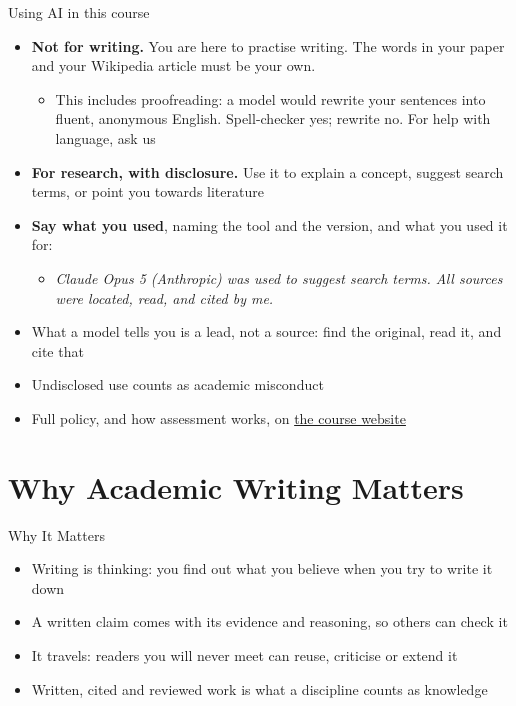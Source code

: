 \documentclass[aspectratio=169]{beamer}
\newcommand{\website}{\href{https://bond-lab.github.io/Open-Knowledge/}{the course website}}
\begin{document}
\begin{frame}{Using AI in this course}
\begin{itemize}
  \item \textbf{Not for writing.}  You are here to practise writing.  The
    words in your paper and your Wikipedia article must be your own.
    \begin{itemize}
      \item This includes proofreading: a model would rewrite your
        sentences into fluent, anonymous English.  Spell-checker yes; rewrite
        no.  For help with language, ask us
    \end{itemize}
  \item \textbf{For research, with disclosure.}  Use it to explain a
    concept, suggest search terms, or point you towards literature
  \item \textbf{Say what you used}, naming the tool and the version, and
    what you used it for:
    \begin{itemize}
      \item \emph{Claude Opus 5 (Anthropic) was used to suggest search
        terms.  All sources were located, read, and cited by me.}
    \end{itemize}
  \item What a model tells you is a lead, not a source: find the original,
    read it, and cite that
  \item Undisclosed use counts as academic misconduct
  \item Full policy, and how assessment works, on \website
\end{itemize}
\end{frame}

\section{Why Academic Writing Matters}

\begin{frame}{Why It Matters}
\begin{itemize}
  \item Writing is thinking: you find out what you believe when you try to write it down
  \item A written claim comes with its evidence and reasoning, so others can check it
  \item It travels: readers you will never meet can reuse, criticise or extend it
  \item Written, cited and reviewed work is what a discipline counts as knowledge
\end{itemize}
\end{frame}
\end{document}
